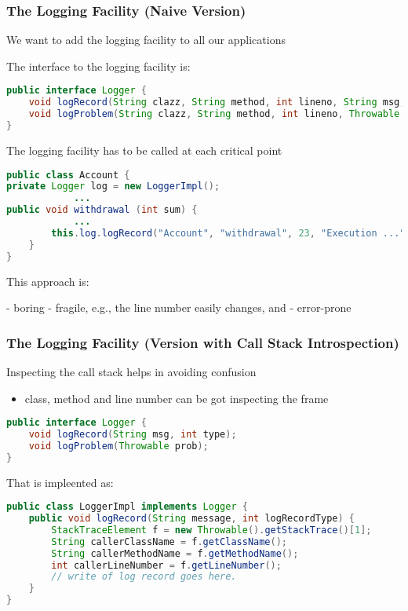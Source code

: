 \subsubsection{The Logging Facility (Naive Version)}
We want to add the logging facility to all our applications

The interface to the logging facility is:

\begin{lstlisting}[language=Java]
public interface Logger {
	void logRecord(String clazz, String method, int lineno, String msg, int type);
	void logProblem(String clazz, String method, int lineno, Throwable prob);
}
\end{lstlisting}

The logging facility has to be called at each critical point

\begin{lstlisting}[language=Java]
public class Account {
private Logger log = new LoggerImpl();
			...
public void withdrawal (int sum) {
			...
		this.log.logRecord("Account", "withdrawal", 23, "Execution ...", 0);
	}
}
\end{lstlisting}

This approach is:
\begin{itemize}
	- boring
	- fragile, e.g., the line number easily changes, and
	- error-prone
\end{itemize}

\subsubsection{The Logging Facility (Version with Call Stack Introspection)}

Inspecting the call stack helps in avoiding confusion
\begin{itemize}
	\item class, method and line number can be got inspecting the frame
\end{itemize}

\begin{lstlisting}[language=Java]
public interface Logger {
	void logRecord(String msg, int type);
	void logProblem(Throwable prob);
}
\end{lstlisting}

That is impleented as:
\begin{lstlisting}[language=Java]
public class LoggerImpl implements Logger {
	public void logRecord(String message, int logRecordType) {
		StackTraceElement f = new Throwable().getStackTrace()[1];
		String callerClassName = f.getClassName();
		String callerMethodName = f.getMethodName();
		int callerLineNumber = f.getLineNumber();
		// write of log record goes here.
	}
}
\end{lstlisting}

